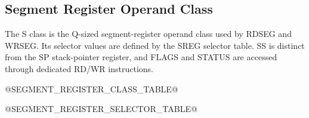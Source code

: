 \subsection{Segment Register Operand Class}
The S class is the Q-sized segment-register operand class used by RDSEG and WRSEG. Its selector values
are defined by the SREG selector table. SS is distinct from the SP stack-pointer register, and FLAGS and
STATUS are accessed through dedicated RD/WR instructions.

@SEGMENT_REGISTER_CLASS_TABLE@

@SEGMENT_REGISTER_SELECTOR_TABLE@
